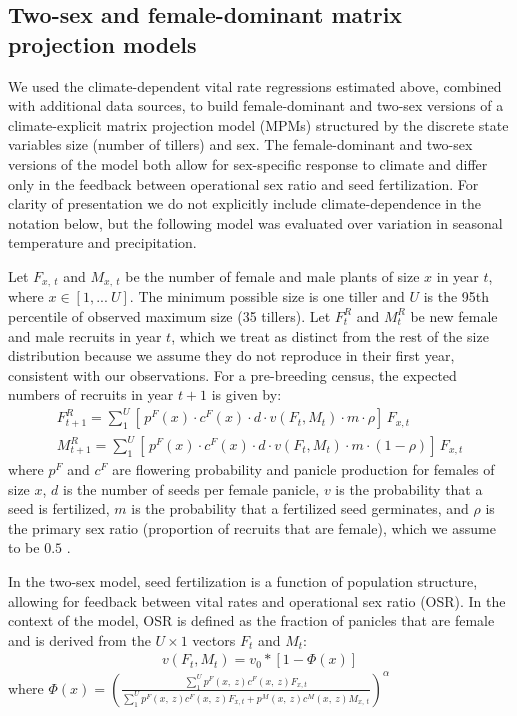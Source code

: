 \documentclass[9pt,twocolumn,twoside,lineno]{pnas-new}
\begin{document}
\subsection*{Two-sex and female-dominant matrix projection models}
We used the climate-dependent vital rate regressions estimated above, combined with additional data sources, to build female-dominant and two-sex versions of a climate-explicit matrix projection model (MPMs) structured by the discrete state variables size (number of tillers) and sex.
The female-dominant and two-sex versions of the model both allow for sex-specific response to climate and differ only in the feedback between operational sex ratio and seed fertilization. 
For clarity of presentation we do not explicitly include climate-dependence in the notation below, but the following model was evaluated over variation in seasonal temperature and precipitation. 

Let $F_{x,\ t}$ and $M_{x,\ t}$ be the number of female and male plants of size $x$ in year $t$, where $x \in [1,...\ U]$.
The minimum possible size is one tiller and $U$ is the 95th percentile of observed maximum size (35 tillers).
Let $F^{R}_{t}$ and $M^{R}_{t}$ be new female and male recruits in year $t$, which we treat as distinct from the rest of the size distribution because we assume they do not reproduce in their first year, consistent with our observations.
For a pre-breeding census, the expected numbers of recruits in year $t+1$ is given by:
\begin{align}\label{eq:recruits}
F^{R}_{t+1} = \sum_{1}^{U} [ \, p^{F}(x) \cdot c^{F}(x) \cdot d \cdot v(F_{t},M_{t}) \cdot m \cdot \rho ] \, F_{x, t} \\
M^{R}_{t+1} = \sum_{1}^{U} [ \, p^{F}(x) \cdot c^{F}(x) \cdot d \cdot v(F_{t},M_{t}) \cdot m \cdot (1-\rho) ] \, F_{x,t}
\end{align}
\noindent where $p^{F}$ and $c^{F}$ are flowering probability and panicle production for females of size $x$, $d$ is the number of seeds per female panicle, $v$ is the probability that a seed is fertilized, $m$ is the probability that a fertilized seed germinates, and $\rho$ is the primary sex ratio (proportion of recruits that are female), which we assume to be $0.5$ \citep{miller2022two}. 

In the two-sex model, seed fertilization is a function of population structure, allowing for feedback between vital rates and operational sex ratio (OSR). 
In the context of the model, OSR is defined as the fraction of panicles that are female and is derived from the $U \times 1$ vectors $F_{t}$ and $M_{t}$:
\begin{align}\label{eq:viab_MPM}
	v(F_{t},M_{t}) = v_{0} * \left[ 1 - \Phi(x) \right]
\end{align}
\noindent where $\Phi(x)= \left( \frac{\sum_{1}^{U} p^{F}(x,\ z) c^{F}(x,\ z) F_{x,t}}{\sum_{1}^{U} p^{F}(x,\ z) c^{F}(x,\ z) F_{x,t} + p^{M}(x,\ z) c^{M}(x,\ z) M_{x,\ t}} \right) ^{\alpha}$
\end{document}

